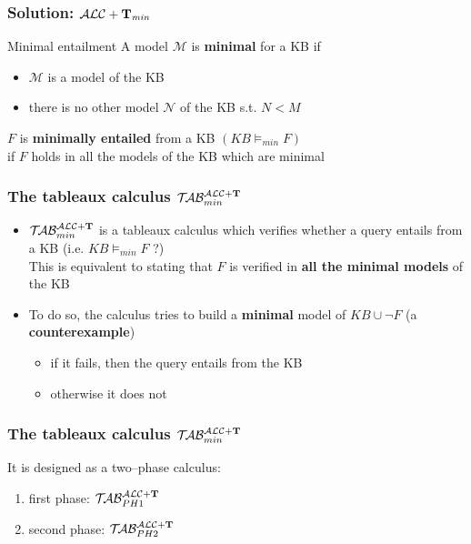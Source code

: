 \documentclass[serif,mathserif]{beamer}
\newcommand{\tip}{{\bf T}}
\newcommand{\alctmin}{\mathcal{ALC}+\tip_{\mbox{\scriptsize \em min}}}
\newcommand{\nuovoc}{\mathrel{{\mathcal{T}\!\mathcal{AB}}}_{min}^{\mathcal{ALC}+\mbox{\scriptsize $\tip$}}}
\newcommand{\primo}{\mathrel{{\mathcal{T}\!\mathcal{AB}}}_{\scriptsize PH 1}^{\mathcal{ALC}+\mbox{\scriptsize $\tip$}}}
\newcommand{\secondo}{\mathrel{{\mathcal{T}\!\mathcal{AB}}}_{\scriptsize PH 2}^{\mathcal{ALC}+\mbox{\scriptsize $\tip$}}}
\begin{document}
\begin{frame}
	\frametitle{Solution: $\alctmin$}
	\begin{block}{Minimal entailment}
	A model $\mathcal{M}$ is \textbf{minimal} for a KB if
		\begin{itemize}
		\item $\mathcal{M}$ is a model of the KB
		\item there is no other model $\mathcal{N}$ of the KB s.t. $N < M$\\[0.5cm]
		\end{itemize}
		$F$ is \textbf{minimally entailed} from a KB \alert{$(KB \models_{min} F)$}\\[0.1cm]
		if $F$ holds in all the models of the KB which are minimal
	\end{block}
\end{frame}


\begin{frame}
	\frametitle{The tableaux calculus $\nuovoc$}
	\begin{itemize}
	\item $\nuovoc$ is a tableaux calculus which 
	verifies whether a query entails from a KB (i.e. $KB \models_{min} F$ ?)\\[0.3cm]
	This is equivalent to stating that $F$ is verified in \textbf{all the minimal models} of the KB\\[0.3cm]
	\item To do so, the calculus tries to build a \textbf{minimal} model of $KB \cup \neg F$ (a \textbf{counterexample})
		\begin{itemize}
		\item if it fails, then the query entails from the KB
		\item otherwise it does not
		\end{itemize}
	\end{itemize}
\end{frame}

\begin{frame}
	\frametitle{The tableaux calculus $\nuovoc$}
 It is designed as a two--phase calculus:
		\begin{enumerate}
		\item first phase: $\primo$ 	
		\item second phase: $\secondo$	
		\end{enumerate}	

\end{frame}
\end{document}

